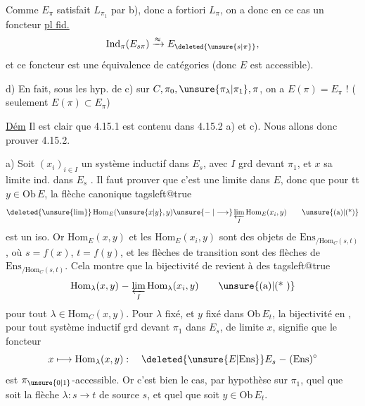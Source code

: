 Comme $E_\pi$ satisfait $L_{\pi_1}$ par b), donc a fortiori $L_\pi$, on a donc en ce cas un foncteur \uline{pl fid.}
\[\mathrm{Ind}_{\pi}(E_{s\pi})\xrightarrow{\approx}E_{\deleted{\unsure{s|\pi}}},\]
et ce foncteur est une équivalence de catégories (donc $E$ est accessible).

d) En fait, sous les hyp. de c) sur $C,\pi_0,\unsure{\pi_\lambda|\pi_1},\pi$, on a $E(\pi)=E_\pi$ ! ( seulement $E(\pi)\subset E_\pi$)

\uline{Dém}  Il est clair que 4.15.1 est contenu dans 4.15.2 a) et c). Nous allons donc prouver 4.15.2.

a) Soit $(x_i)_{i\in I}$ un système inductif dans $E_s$, avec $I$ grd devant $\pi_1$, et $x$ sa limite ind. dans $E_s$ . Il faut prouver que c'est une limite dans $E$, donc que pour tt $y\in\mathrm{Ob}\,E$, la flèche canonique
{\csname tagsleft@true\endcsname
\[\deleted{\unsure{\lim}}\,\mathrm{Hom}_E(\unsure{x|y},y)\unsure{\relbar|\longrightarrow}\varprojlim_I\mathrm{Hom}_E(x_i,y)\tag*{\unsure{(a)|(*)}}\]}
est un iso. Or $\mathrm{Hom}_E(x,y)$ et les $\mathrm{Hom}_E(x_i,y)$ sont des objets de $\mathrm{Ens}_{/\mathrm{Hom}_C(s,t)}$, où $s=f(x)$, $t=f(y)$, et les flèches de transition sont des flèches de $\mathrm{Ens}_{/\mathrm{Hom}_C(s,t)}$. Cela montre que la bijectivité de  revient à  des
{\csname tagsleft@true\endcsname
\[\mathrm{Hom}_\lambda(x,y)\relbar\varprojlim_I\mathrm{Hom}_\lambda(x_i,y)\tag*{\unsure{(a)|(* )}}\]}
pour tout $\lambda\in\mathrm{Hom}_C(x,y)$. Pour $\lambda$ fixé, et $y$ fixé dans $\mathrm{Ob}\,E_t$, la bijectivité en , pour tout système inductif grd devant $\pi_1$ dans $E_s$, de limite $x$, signifie que le foncteur
\[x\longmapsto\mathrm{Hom}_\lambda(x,y):\quad\deleted{\unsure{E| \mathrm{Ens}}}E_s\relbar(\mathrm{Ens})^\circ\]
est $\pi_{\unsure{0|1}}$-accessible. Or c'est bien le cas, par hypothèse sur $\pi_1$, quel que soit la flèche  $\lambda:s\to t$ de source $s$, et quel que soit $y\in\mathrm{Ob}\,E_t$.


